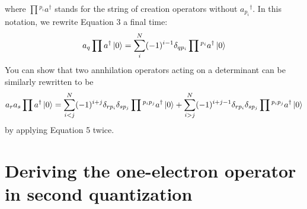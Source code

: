 \documentclass{article}
\newcommand{\dg}{\ensuremath{^\dagger} }
\begin{document}
where $\prod{}^{p_i} a\dg $ stands for the string of creation operators without $a_{p_i}\dg$. 
In this notation, we rewrite Equation 3 a final time: 
\begin{equation}
a_q \prod a\dg \ket{0} =  \sum_i^N (-1)^{i-1} \delta_{qp_i} \prod{}^{p_i} a\dg \ket{0}
\end{equation}
You can show that two annhilation operators acting on a determinant can be similarly rewritten to be
\begin{equation}
a_r a_s \prod a\dg \ket{0} = \sum\limits_{i < j} ^N  (-1)^{i + j }   \delta_{rp_i} \delta_{sp_j}  \prod{}^{p_ip_j} a\dg \ket{0} + 
\sum\limits_{i > j} ^N  (-1)^{i + j -1} \delta_{rp_i} \delta_{sp_j} \prod{}^{p_ip_j}a\dg \ket{0}
\end{equation}
by applying Equation 5 twice. 

\section{Deriving the one-electron operator in second quantization}
\end{document}
